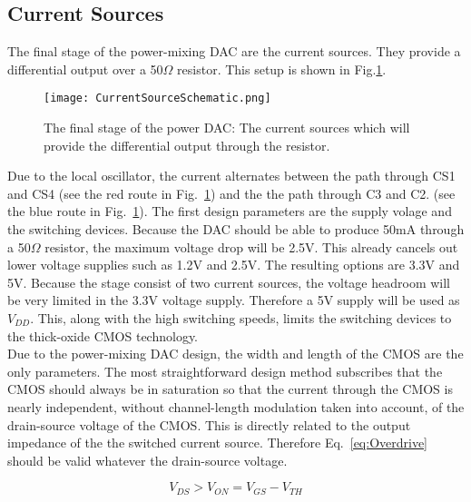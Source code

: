 
\subsection{Current Sources}\label{sec:currentsources}
The final stage of the power-mixing DAC are the current sources. They provide a differential output over a 50$\Omega$ resistor. This setup is shown in Fig.\ref{figure:Current_sources}.
\begin{figure}[h!]
\begin{center}
\texttt{[image: CurrentSourceSchematic.png]}
\caption{The final stage of the power DAC: The current sources which will provide the differential output through the resistor.}
\label{figure:Current_sources}
\end{center}
\end{figure}
Due to the local oscillator, the current alternates between the path through CS1 and CS4 (see the red route in Fig.~\ref{figure:Current_sources}) and the the path through C3 and C2. (see the blue route in Fig.~\ref{figure:Current_sources}). 
The first design parameters are the supply volage and the switching devices. Because the DAC should be able to produce 50mA through a 50$\Omega$ resistor, the maximum voltage drop will be 2.5V. This already cancels out lower voltage supplies such as 1.2V and 2.5V. The resulting options are 3.3V and 5V. Because the stage consist of two current sources, the voltage headroom will be very limited in the 3.3V voltage supply. Therefore a 5V supply will be used as $V_{DD}$. This, along with the high switching speeds, limits the switching devices to the thick-oxide CMOS technology.\\
Due to the power-mixing DAC design, the width and length of the CMOS are the only parameters. The most straightforward design method subscribes that the CMOS should always be in saturation so that the current through the CMOS is nearly independent, without channel-length modulation taken into account, of the drain-source voltage of the CMOS. This is directly related to the output impedance of the the switched current source. Therefore Eq.~\ref{eq:Overdrive} should be valid whatever the drain-source voltage.

\begin{equation}\label{eq:Overdrive}{V_{DS} > V_{ON} = V_{GS} - V_{TH}}\end{equation}

